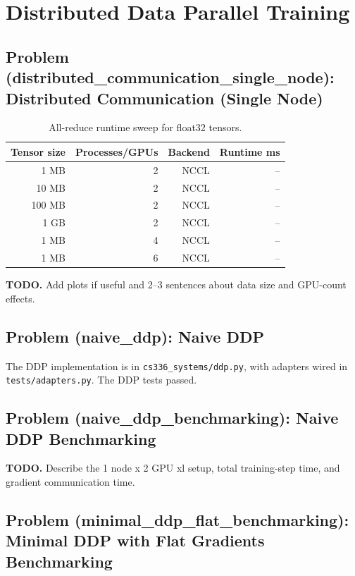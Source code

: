 \documentclass[11pt]{article}
\newcommand{\todoanswer}[1]{%
  \par\smallskip
  \noindent\colorbox{yellow!18}{%
    \parbox{\dimexpr\linewidth-2\fboxsep\relax}{\textbf{TODO.} #1}%
  }%
  \par\smallskip
}
\newcommand{\codepath}[1]{\texttt{#1}}
\begin{document}
\section{Distributed Data Parallel Training}

\subsection{Problem (distributed\_communication\_single\_node): Distributed Communication (Single Node)}

\begin{table}[H]
  \centering
  \caption{All-reduce runtime sweep for float32 tensors.}
  \begin{tabular}{rrrr}
    \toprule
    Tensor size & Processes/GPUs & Backend & Runtime ms \\
    \midrule
    1 MB & 2 & NCCL & -- \\
    10 MB & 2 & NCCL & -- \\
    100 MB & 2 & NCCL & -- \\
    1 GB & 2 & NCCL & -- \\
    1 MB & 4 & NCCL & -- \\
    1 MB & 6 & NCCL & -- \\
    \bottomrule
  \end{tabular}
\end{table}
\todoanswer{Add plots if useful and 2--3 sentences about data size and GPU-count effects.}

\subsection{Problem (naive\_ddp): Naive DDP}

The DDP implementation is in \codepath{cs336\_systems/ddp.py}, with adapters wired in \codepath{tests/adapters.py}. The DDP tests passed.

\subsection{Problem (naive\_ddp\_benchmarking): Naive DDP Benchmarking}

\todoanswer{Describe the 1 node x 2 GPU xl setup, total training-step time, and gradient communication time.}

\subsection{Problem (minimal\_ddp\_flat\_benchmarking): Minimal DDP with Flat Gradients Benchmarking}
\end{document}
